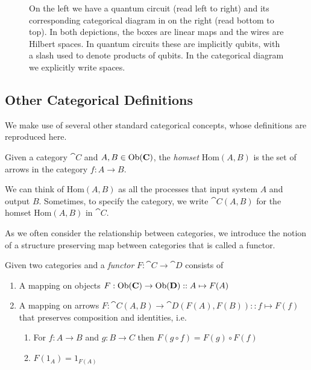 \begin{figure}[t]
\label{fig:QCDSMC}

\caption[Comparison of quantum circuits and symmetric monoidal diagrams]{On the left we have a quantum circuit (read left to right) and its corresponding categorical diagram in  on the right (read bottom to top). In both depictions, the boxes are linear maps and the wires are Hilbert spaces. In quantum circuits these are implicitly qubits, with a slash used to denote products of qubits. In the categorical diagram we explicitly write spaces.}
\end{figure}

\subsection{Other Categorical Definitions}

We make use of several other standard categorical concepts, whose definitions are reproduced here.

\begin{defn}
Given a category $\cat{C}$ and $A,B\in\mbox{Ob}(\mathbf{C})$, the \emph{homset} Hom$(A,B)$ is the set of arrows in the category $f:A\to B$.
\end{defn}

We can think of Hom$(A,B)$ as all the processes that input system $A$ and output $B$. Sometimes, to specify the category, we write $\cat{C}(A,B)$ for the homset Hom$(A,B)$ in $\cat{C}$.

As we often consider the relationship between categories, we introduce the notion of a structure preserving map between categories that is called a functor.

\begin{defn}
Given two categories  and  a \emph{functor} $F:\cat{C}\to\cat{D}$ consists of
\begin{enumerate}
\item A mapping on objects $F:\mbox{Ob}(\mathbf{C})\to\mbox{Ob}(\mathbf{D})::A\mapsto F(A)$
\item A mapping on arrows $F:\cat{C}(A,B)\to\cat{D}(F(A),F(B))::f\mapsto F(f)$ that preserves composition and identities, i.e. 
\begin{enumerate}
\item For $f:A\to B$ and $g:B\to C$ then $F(g\circ f) = F(g)\circ F(f)$
\item $F(1_A)=1_{F(A)}$
\end{enumerate}
\end{enumerate}
\end{defn}

